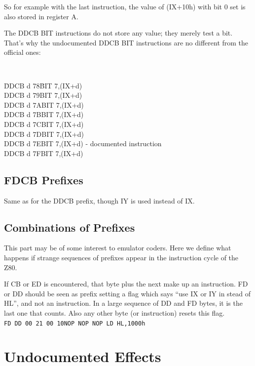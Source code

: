 \documentclass[oneside,a4paper]{book}
\begin{document}
So for example with the last instruction, the value of (IX+10h) with bit 0 
set is also stored in register A.

The DDCB BIT instructions do not store any value; they merely test a bit.
That's why the undocumented DDCB BIT instructions are no different from
the official ones:

{\tt
  \begin{tabbing}
    {\qquad}\=DDCB d 78{\qquad}\=BIT 7,(IX+d)\+\\
    DDCB d 79\>BIT 7,(IX+d)\\
    DDCB d 7A\>BIT 7,(IX+d)\\
    DDCB d 7B\>BIT 7,(IX+d)\\
    DDCB d 7C\>BIT 7,(IX+d)\\
    DDCB d 7D\>BIT 7,(IX+d)\\
    DDCB d 7E\>BIT 7,(IX+d) {\rm - documented instruction}\\
    DDCB d 7F\>BIT 7,(IX+d)
  \end{tabbing}
}

\section{FDCB Prefixes}

Same as for the DDCB prefix, though IY is used instead of IX.

\section{Combinations of Prefixes}

This part may be of some interest to emulator coders. Here we define
what happens if strange sequences of prefixes appear in the instruction
cycle of the Z80.

If CB or ED is encountered, that byte plus the next make up an instruction.
FD or DD should be seen as prefix setting a flag which says ``use IX or IY in
stead of HL'', and not an instruction. In a large sequence of DD and FD
bytes, it is the last one that counts. Also any other byte (or instruction)
resets this flag. \\[0.5ex]

{\tt {\qquad}FD DD 00 21 00 10{\qquad}NOP NOP NOP LD HL,1000h}


\chapter{Undocumented Effects}
\end{document}
